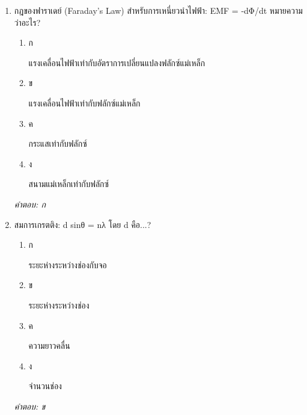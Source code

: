 \documentclass[12pt]{article}
\begin{document}
\begin{enumerate}[label=\arabic*., itemsep=0.5\baselineskip, topsep=0.5\baselineskip, leftmargin=*]
\item กฎของฟาราเดย์ (Faraday's Law) สำหรับการเหนี่ยวนำไฟฟ้า: EMF = -dΦ/dt หมายความว่าอะไร?
\begin{enumerate}[label=\alph*)., itemsep=0.3\baselineskip, topsep=0.3\baselineskip]
\item ก\ 
\begin{minipage}[t]{0.9\linewidth}
\raggedright แรงเคลื่อนไฟฟ้าเท่ากับอัตราการเปลี่ยนแปลงฟลักซ์แม่เหล็ก
\end{minipage}
\item ข\ 
\begin{minipage}[t]{0.9\linewidth}
\raggedright แรงเคลื่อนไฟฟ้าเท่ากับฟลักซ์แม่เหล็ก
\end{minipage}
\item ค\ 
\begin{minipage}[t]{0.9\linewidth}
\raggedright กระแสเท่ากับฟลักซ์
\end{minipage}
\item ง\ 
\begin{minipage}[t]{0.9\linewidth}
\raggedright สนามแม่เหล็กเท่ากับฟลักซ์
\end{minipage}
\end{enumerate}
\vspace{-0.3\baselineskip}
\begin{small}
\textit{คำตอบ: ก}
\end{small}

\item สมการเกรตติง: d sinθ = nλ โดย d คือ...?
\begin{enumerate}[label=\alph*)., itemsep=0.3\baselineskip, topsep=0.3\baselineskip]
\item ก\ 
\begin{minipage}[t]{0.9\linewidth}
\raggedright ระยะห่างระหว่างช่องกับจอ
\end{minipage}
\item ข\ 
\begin{minipage}[t]{0.9\linewidth}
\raggedright ระยะห่างระหว่างช่อง
\end{minipage}
\item ค\ 
\begin{minipage}[t]{0.9\linewidth}
\raggedright ความยาวคลื่น
\end{minipage}
\item ง\ 
\begin{minipage}[t]{0.9\linewidth}
\raggedright จำนวนช่อง
\end{minipage}
\end{enumerate}
\vspace{-0.3\baselineskip}
\begin{small}
\textit{คำตอบ: ข}
\end{small}


\end{enumerate}
\end{document}
